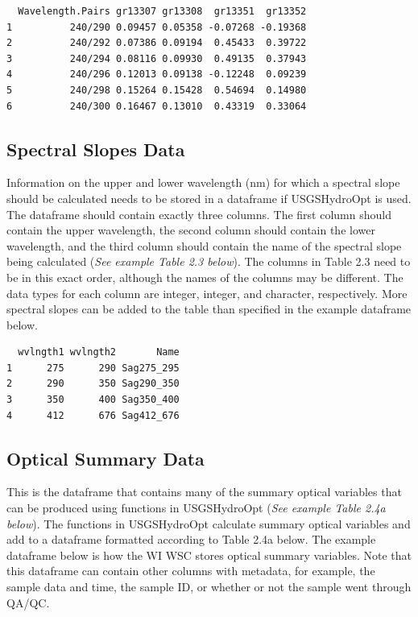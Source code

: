 \documentclass[a4paper,11pt]{article}\usepackage[]{graphicx}\usepackage[]{color}
\makeatletter
\newenvironment{kframe}{%
 \def\at@end@of@kframe{}%
 \ifinner\ifhmode%
  \def\at@end@of@kframe{\end{minipage}}%
  \begin{minipage}{\columnwidth}%
 \fi\fi%
 \def\FrameCommand##1{\hskip\@totalleftmargin \hskip-\fboxsep
 \colorbox{shadecolor}{##1}\hskip-\fboxsep
     \hskip-\linewidth \hskip-\@totalleftmargin \hskip\columnwidth}%
 \MakeFramed {\advance\hsize-\width
   \@totalleftmargin\z@ \linewidth\hsize
   \@setminipage}}%
 {\par\unskip\endMakeFramed%
 \at@end@of@kframe}
\newenvironment{knitrout}{}{} %
\makeatother
\begin{document}
\begin{knitrout}
\color{fgcolor}\begin{kframe}
\begin{verbatim}
  Wavelength.Pairs gr13307 gr13308  gr13351  gr13352
1          240/290 0.09457 0.05358 -0.07268 -0.19368
2          240/292 0.07386 0.09194  0.45433  0.39722
3          240/294 0.08116 0.09930  0.49135  0.37943
4          240/296 0.12013 0.09138 -0.12248  0.09239
5          240/298 0.15264 0.15428  0.54694  0.14980
6          240/300 0.16467 0.13010  0.43319  0.33064
\end{verbatim}
\end{kframe}
\end{knitrout}

\subsection{Spectral Slopes Data}
Information on the upper and lower wavelength (nm) for which a spectral slope should be calculated needs to be stored in a dataframe if USGSHydroOpt is used. The dataframe should contain exactly three columns. The first column should contain the upper wavelength, the second column should contain the lower wavelength, and the third column should contain the name of the spectral slope being calculated (\emph{See example Table 2.3 below}). The columns in Table 2.3 need to be in this exact order, although the names of the columns may be different. The data types for each column are integer, integer, and character, respectively. More spectral slopes can be added to the table than specified in the example dataframe below.

\begin{knitrout}
\color{fgcolor}\begin{kframe}
\begin{verbatim}
  wvlngth1 wvlngth2       Name
1      275      290 Sag275_295
2      290      350 Sag290_350
3      350      400 Sag350_400
4      412      676 Sag412_676
\end{verbatim}
\end{kframe}
\end{knitrout}

\subsection{Optical Summary Data}
This is the dataframe that contains many of the summary optical variables that can be produced using functions in USGSHydroOpt (\emph{See example Table 2.4a below}). The functions in USGSHydroOpt calculate summary optical variables and add to a dataframe formatted according to Table 2.4a below.  The example dataframe below is how the WI WSC stores optical summary variables. Note that this dataframe can contain other columns with metadata, for example, the sample data and time, the sample ID, or whether or not the sample went through QA/QC.
\end{document}
